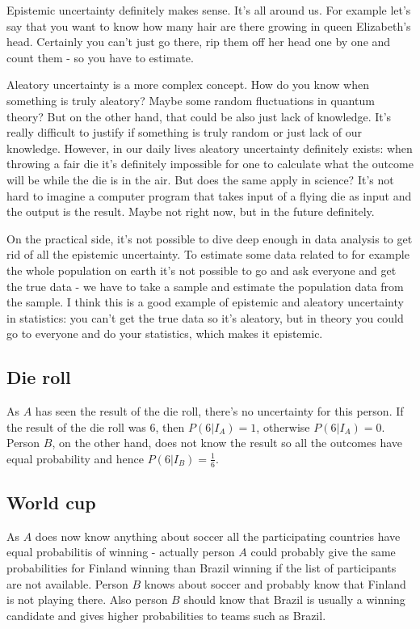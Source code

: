 \documentclass[11pt]{amsart}
\begin{document}
Epistemic uncertainty definitely makes sense. It's all around us. For example let's say that you want to know how many hair are there growing in queen Elizabeth's head. Certainly you can't just go there, rip them off her head one by one and count them - so you have to estimate.

Aleatory uncertainty is a more complex concept. How do you know when something is truly aleatory? Maybe some random fluctuations in quantum theory? But on the other hand, that could be also just lack of knowledge. It's really difficult to justify if something is truly random or just lack of our knowledge. However, in our daily lives aleatory uncertainty definitely exists: when throwing a fair die it's definitely impossible for one to calculate what the outcome will be while the die is in the air. But does the same apply in science? It's not hard to imagine a computer program that takes input of a flying die as input and the output is the result. Maybe not right now, but in the future definitely.

On the practical side, it's not possible to dive deep enough in data analysis to get rid of all the epistemic uncertainty. To estimate some data related to for example the whole population on earth it's not possible to go and ask everyone and get the true data - we have to take a sample and estimate the population data from the sample. I think this is a good example of epistemic and aleatory uncertainty in statistics: you can't get the true data so it's aleatory, but in theory you could go to everyone and do your statistics, which makes it epistemic.

\subsection*{Die roll} As $A$ has seen the result of the die roll, there's no uncertainty for this person. If the result of the die roll was 6, then $P(6|I_A) = 1$, otherwise $P(6|I_A) = 0$. Person $B$, on the other hand, does not know the result so all the outcomes have equal probability and hence $P(6|I_B) = \frac{1}{6}$.

\subsection*{World cup} As $A$ does now know anything about soccer all the participating countries have equal probabilitis of winning - actually person $A$ could probably give the same probabilities for Finland winning than Brazil winning if the list of participants are not available. Person $B$ knows about soccer and probably know that Finland is not playing there. Also person $B$ should know that Brazil is usually a winning candidate and gives higher probabilities to teams such as Brazil.
\end{document}
